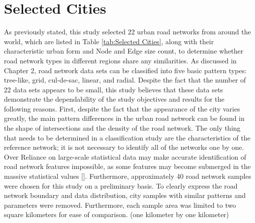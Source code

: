 \section{Selected Cities}
As previously stated, this study selected 22 urban road networks from around the world, which are listed in Table \ref{tab:Selected Cities}, along with their characteristic urban form and Node and Edge size count, to determine whether road network types in different regions share any similarities. As discussed in Chapter 2, road network data sets can be classified into five basic pattern types: tree-like, grid, cul-de-sac, linear, and radial. Despite the fact that the number of 22 data sets appears to be small, this study believes that these data sets demonstrate the dependability of the study objectives and results for the following reasons. First, despite the fact that the appearance of the city varies greatly, the main pattern differences in the urban road network can be found in the shape of intersections and the density of the road network. The only thing that needs to be determined in a classification study are the characteristics of the reference network; it is not necessary to identify all of the networks one by one. Over Reliance on large-scale statistical data may make accurate identification of road network features impossible, as some features may become submerged in the massive statistical values [\cite{Han:2020}]. Furthermore, approximately 40 road network samples were chosen for this study on a preliminary basis. To clearly express the road network boundary and data distribution, city samples with similar patterns and parameters were removed.
Furthermore, each sample area was limited to two square kilometers for ease of comparison. (one kilometer by one kilometer)


